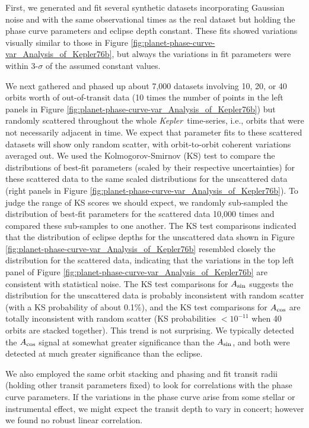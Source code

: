 \documentclass[manuscript]{aastex62}
\newcommand{\kepler}{{\it Kepler}}
\begin{document}
First, we generated and fit several synthetic datasets incorporating Gaussian noise and with the same observational times as the real dataset but holding the phase curve parameters and eclipse depth constant. These fits showed variations visually similar to those in Figure \ref{fig:planet-phase-curve-var_Analysis_of_Kepler76b}, but always the variations in fit parameters were within 3-$\sigma$ of the assumed constant values.

We next gathered and phased up about 7,000 datasets involving 10, 20, or 40 orbits worth of out-of-transit data (10 times the number of points in the left panels in Figure \ref{fig:planet-phase-curve-var_Analysis_of_Kepler76b}) but randomly scattered throughout the whole \kepler\ time-series, i.e., orbits that were not necessarily adjacent in time. We expect that parameter fits to these scattered datasets will show only random scatter, with orbit-to-orbit coherent variations averaged out. We used the Kolmogorov-Smirnov (KS) test \citep[p.~730]{Press:2007:NRE:1403886} to compare the distributions of best-fit parameters (scaled by their respective uncertainties) for these scattered data to the same scaled distributions for the unscattered data (right panels in Figure \ref{fig:planet-phase-curve-var_Analysis_of_Kepler76b}). To judge the range of KS scores we should expect, we randomly sub-sampled the distribution of best-fit parameters for the scattered data 10,000 times and compared these sub-samples to one another. The KS test comparisons indicated that the distribution of eclipse depths for the unscattered data shown in Figure \ref{fig:planet-phase-curve-var_Analysis_of_Kepler76b} resembled closely the distribution for the scattered data, indicating that the variations in the top left panel of Figure \ref{fig:planet-phase-curve-var_Analysis_of_Kepler76b} are consistent with statistical noise. The KS test comparisons for $A_{\rm sin}$ suggests the distribution for the unscattered data is probably inconsistent with random scatter (with a KS probability of about 0.1\%), and the KS test comparisons for $A_{\rm cos}$ are totally inconsistent with random scatter (KS probabilities $<10^{-11}$ when 40 orbits are stacked together). This trend is not surprising. We typically detected the $A_{\rm cos}$ signal at somewhat greater significance than the $A_{\rm sin}$, and both were detected at much greater significance than the eclipse. 

We also employed the same orbit stacking and phasing and fit transit radii (holding other transit parameters fixed) to look for correlations with the phase curve parameters. If the variations in the phase curve arise from some stellar or instrumental effect, we might expect the transit depth to vary in concert; however we found no robust linear correlation.
\end{document}
